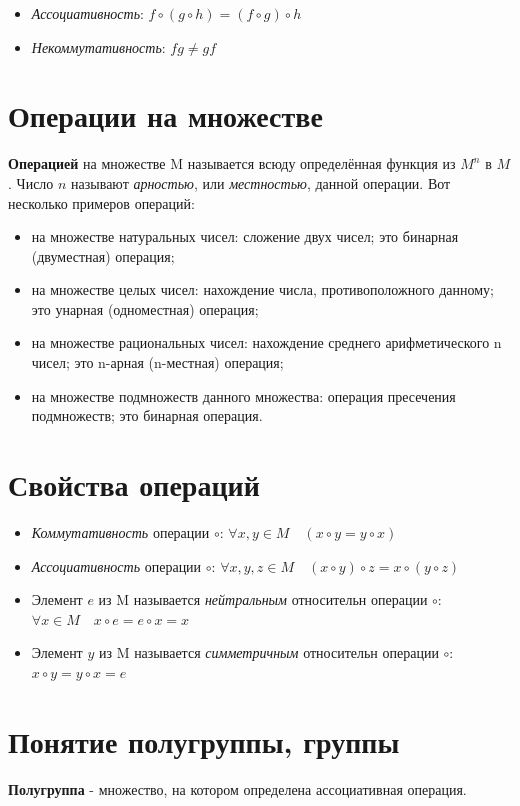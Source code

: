 \documentclass[a4paper]{article}
\begin{document}
\begin{itemize}
\item \textit{Ассоциативность}: $f \circ (g \circ h) = (f \circ g) \circ h$
\item \textit{Некоммутативность}: $fg \neq gf$

\end{itemize}
\section*{Операции на множестве}
\textbf{Операцией} на множестве M называется всюду
определённая функция из $M^n$ в $M$. Число $n$ называют \textit{арностью}, или
\textit{местностью}, данной операции.
Вот несколько примеров операций:
\begin{itemize}
\item на множестве натуральных чисел: сложение двух чисел; это бинарная
(двуместная) операция;
\item на множестве целых чисел: нахождение числа, противоположного
данному; это унарная (одноместная) операция;
\item на множестве рациональных чисел: нахождение среднего арифметического
n чисел; это n-арная (n-местная) операция;
\item на множестве подмножеств данного множества: операция пресечения
подмножеств; это бинарная операция.
\end{itemize}

\section*{Свойства операций}
\begin{itemize}
\item \textit{Коммутативность} операции $\circ$: $\forall x, y \in M \quad (x \circ y = y \circ x)$
\item \textit{Ассоциативность} операции $\circ$: $\forall x, y, z \in M \quad (x \circ y) \circ z = x \circ (y \circ z)$
\item Элемент $e$ из M называется \textit{нейтральным} относительн операции $\circ$: $\forall x \in M \quad x \circ e = e \circ x = x$
\item Элемент $y$ из M называется \textit{симметричным} относительн операции $\circ$: $x \circ y = y \circ x = e$
\end{itemize}

\section*{Понятие полугруппы, группы}
\textbf{Полугруппа} - множество, на котором определена ассоциативная операция.
\end{document}
